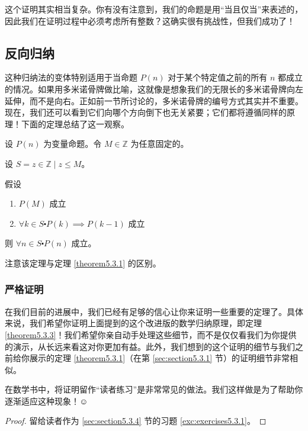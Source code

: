 这个证明其实相当复杂。你有没有注意到，我们的命题是用``当且仅当''来表述的，因此我们在证明过程中必须考虑所有整数？这确实很有挑战性，但我们成功了！

\subsection{反向归纳}

这种归纳法的变体特别适用于当命题 $P(n)$ 对于某个特定值之前的所有 $n$ 都成立的情况。如果用多米诺骨牌做比喻，这就像是想象我们的无限长的多米诺骨牌向左延伸，而不是向右。正如前一节所讨论的，多米诺骨牌的编号方式其实并不重要。现在，我们还可以看到它们向哪个方向倒下也无关紧要；它们都将遵循同样的原理！下面的定理总结了这一观察。

\begin{theorem}[反向归纳]\label{theorem5.3.3}
    设 $P(n)$ 为变量命题。令 $M \in \mathbb{Z}$ 为任意固定的。

    设 $S = {z \in \mathbb{Z} \mid z \le M}$。

    假设
    \begin{enumerate}[label=(\arabic*)]
        \item $P(M)$ 成立
        \item $\forall k \in S \centerdot P(k) \implies P(k - 1)$ 成立
    \end{enumerate}

    则 $\forall n \in S \centerdot P(n)$ 成立。
\end{theorem}

注意该定理与定理 \ref{theorem5.3.1} 的区别。

\subsubsection*{严格证明}

在我们目前的进展中，我们已经有足够的信心让你来证明一些重要的定理了。具体来说，我们希望你证明上面提到的这个改进版的数学归纳原理，即定理 \ref{theorem5.3.3}！我们希望你亲自动手处理这些细节，而不是仅仅看我们为你提供的演示，从长远来看这对你更加有益。此外，我们想到的这个证明的细节与我们之前给你展示的定理 \ref{theorem5.3.1}（在第 \ref{sec:section5.3.1} 节）的证明细节非常相似。

在数学书中，将证明留作``读者练习''是非常常见的做法。我们这样做是为了帮助你逐渐适应这种现象！$\smiley{}$

\begin{proof}
    留给读者作为 \ref{sec:section5.3.4} 节的习题 \ref{exc:exercises5.3.1}。
\end{proof}

